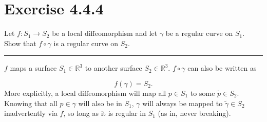 \documentclass[12pt]{article}
\newcommand{\R}
{
\mathbb{R}
}
\begin{document}
\maketitle

\section*{Exercise 4.4.4}
\indent
Let $f: S_1 \rightarrow S_2$ be a local diffeomorphism and let $\gamma$ be a regular curve on $S_1$. Show that $f \circ \gamma$ is a regular curve on $S_2$.

\vspace{1cm}
\hrule
\vspace{1cm}
\noindent

$f$ maps a surface $S_1 \in \R^3$ to another surface $S_2 \in \R^3$. $f \circ \gamma$ can also be written as

$$
f( \gamma ) = S_2.
$$
\indent
More explicitly, a local diffeomorphism will map all $p \in S_1$ to some $\tilde{p} \in S_2$.\\
\indent
Knowing that all $p \in \gamma$ will also be in $S_1$, $\gamma$ will always be mapped to $\tilde{\gamma} \in S_2$ inadvertently via $f$, so long as it is regular in $S_1$ (as in, never breaking).
\end{document}
